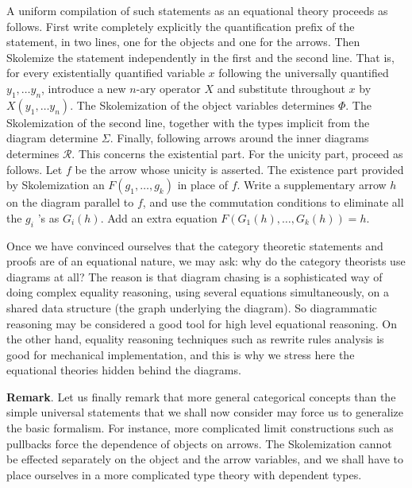 A uniform compilation of such statements as an equational theory proceeds as follows.
First write completely explicitly the quantification prefix of the statement, in two
lines, one for the objects and one for the arrows. Then Skolemize the statement
independently in the first and the second line. That is, for every existentially
quantified variable $x$ following the universally quantified $y_1, \ldots y_n$, introduce
a new $n$-ary operator $X$ and substitute throughout $x$ by $X\left(y_1, \ldots
y_n\right)$. The Skolemization of the object variables determines $\Phi$. The
Skolemization of the second line, together with the types implicit from the diagram
determine $\Sigma$. Finally, following arrows around the inner diagrams determines
$\mathcal{R}$. This concerns the existential part. For the unicity part, proceed as
follows. Let $f$ be the arrow whose unicity is asserted. The existence part provided by
Skolemization an $F\left(g_1, \ldots, g_k\right)$ in place of $f$. Write a supplementary
arrow $h$ on the diagram parallel to $f$, and use the commutation conditions to eliminate
all the $g_i$ 's as $G_i(h)$. Add an extra equation $F\left(G_1(h), \ldots,
G_k(h)\right)=h$.

Once we have convinced ourselves that the category theoretic statements and proofs are of
an equational nature, we may ask: why do the category theorists use diagrams at all? The
reason is that diagram chasing is a sophisticated way of doing complex equality reasoning,
using several equations simultaneously, on a shared data structure (the graph underlying
the diagram). So diagrammatic reasoning may be considered a good tool for high level
equational reasoning. On the other hand, equality reasoning techniques such as rewrite
rules analysis is good for mechanical implementation, and this is why we stress here the
equational theories hidden behind the diagrams. 

\bigskip\noindent
{\bf Remark}. Let us finally remark that more
general categorical concepts than the simple universal statements that we shall now
consider may force us to generalize the basic formalism. For instance, more complicated
limit constructions such as pullbacks force the dependence of objects on arrows. The
Skolemization cannot be eﬀected separately on the object and the arrow variables, and we
shall have to place ourselves in a more complicated type theory with dependent types.












